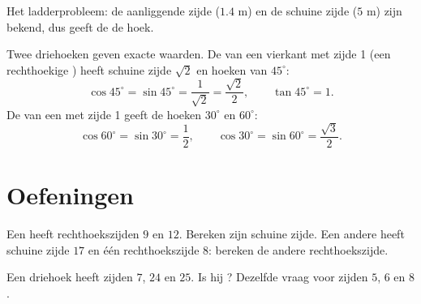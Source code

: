 \begin{omfigure}

{\small Het ladderprobleem: de aanliggende zijde ($1.4$ m) en de schuine zijde
($5$ m) zijn bekend, dus geeft de  de hoek.}
\end{omfigure}

\begin{example}\label{ex:g9:trig:special}
Twee driehoeken geven exacte waarden. De  van een vierkant met zijde 1 (een
rechthoekige ) heeft schuine zijde $\sqrt2$ en hoeken van
$45^\circ$:
\[
\cos 45^\circ = \sin 45^\circ = \frac{1}{\sqrt2} = \frac{\sqrt2}{2},
\qquad \tan 45^\circ = 1 .
\]
De  van een  met zijde 1 geeft de hoeken $30^\circ$ en
$60^\circ$:
\[
\cos 60^\circ = \sin 30^\circ = \frac12,
\qquad
\cos 30^\circ = \sin 60^\circ = \frac{\sqrt3}{2}.
\]
\end{example}

\section{Oefeningen}

\begin{exercise}[$\star$]\label{exo:g9:trig:1}
Een  heeft rechthoekszijden $9$ en $12$. Bereken zijn schuine
zijde. Een andere heeft schuine zijde $17$ en één rechthoekszijde $8$: bereken de
andere rechthoekszijde.
\end{exercise}

\begin{exercise}[$\star$]\label{exo:g9:trig:2}
Een driehoek heeft zijden $7$, $24$ en $25$. Is hij ? Dezelfde vraag
voor zijden $5$, $6$ en $8$.
\end{exercise}

